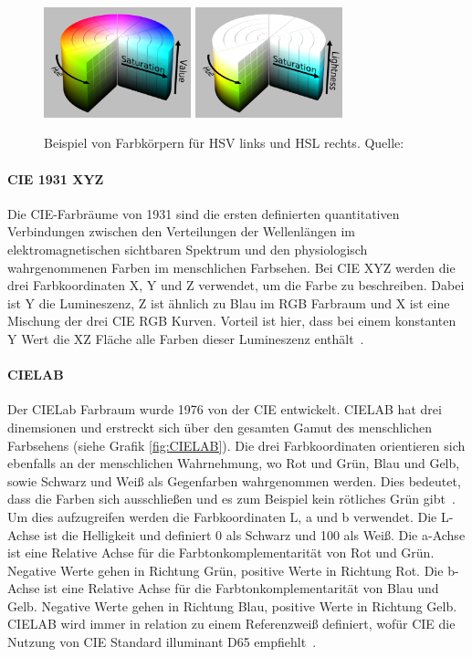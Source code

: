 \documentclass[12pt, a4paper, ngerman]{article}
\begin{document}
\begin{figure}
  \centering
  \includegraphics[width=0.38\textwidth]{Grafiken/HSV_Zylinder.png}
  \includegraphics[width=0.38\textwidth]{Grafiken/HSL_Zylinder.png}
  \caption{Beispiel von Farbkörpern für HSV links und HSL rechts. Quelle:~\cite{HSL_and_HSV_2023}}
  \label{fig:HSV_HSL}
\end{figure}

\paragraph{CIE 1931 XYZ}
Die \acs{CIE}-Farbräume von 1931 sind die ersten definierten quantitativen Verbindungen zwischen den Verteilungen 
der Wellenlängen im elektromagnetischen sichtbaren Spektrum und den physiologisch wahrgenommenen Farben im menschlichen Farbsehen. 
Bei CIE XYZ werden die drei Farbkoordinaten X, Y und Z verwendet, um die Farbe zu beschreiben.
Dabei ist Y die Lumineszenz, Z ist ähnlich zu Blau im RGB Farbraum und X ist eine Mischung der drei CIE RGB Kurven.
Vorteil ist hier, dass bei einem konstanten Y Wert die XZ Fläche alle Farben dieser Lumineszenz enthält~\cite{CIE_1931_color_space_2023}.

\paragraph{CIELAB}
Der CIE\acs{Lab} Farbraum wurde 1976 von der CIE entwickelt.
CIELAB hat drei dinemsionen und erstreckt sich über den gesamten Gamut des menschlichen Farbsehens (siehe Grafik \ref{fig:CIELAB}).
Die drei Farbkoordinaten orientieren sich ebenfalls an der menschlichen Wahrnehmung, 
wo Rot und Grün, Blau und Gelb, sowie Schwarz und Weiß als Gegenfarben wahrgenommen werden.
Dies bedeutet, dass die Farben sich ausschließen und es zum Beispiel kein rötliches Grün gibt~\cite{Becker-Carus_Wendt_2017}.
Um dies aufzugreifen werden die Farbkoordinaten L, a und b verwendet.
Die L-Achse ist die Helligkeit und definiert 0 als Schwarz und 100 als Weiß.
Die a-Achse ist eine Relative Achse für die Farbtonkomplementarität von Rot und Grün.
Negative Werte gehen in Richtung Grün, positive Werte in Richtung Rot.
Die b-Achse ist eine Relative Achse für die Farbtonkomplementarität von Blau und Gelb.
Negative Werte gehen in Richtung Blau, positive Werte in Richtung Gelb.
CIELAB wird immer in relation zu einem Referenzweiß definiert, 
wofür CIE die Nutzung von CIE Standard illuminant D65 empfiehlt~\cite{CIELAB_color_space_2023}.
\end{document}

